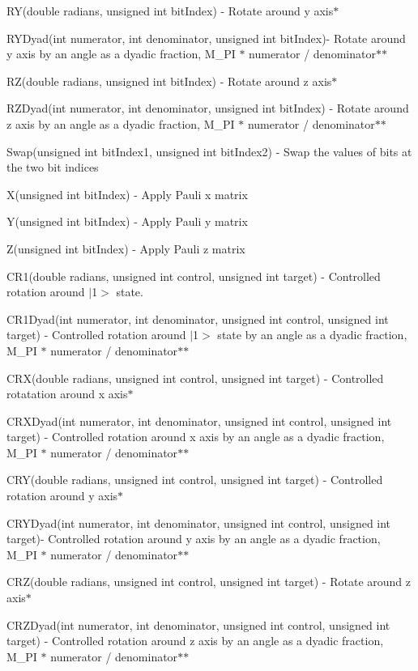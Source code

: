 R\+Y(double radians, unsigned int bit\+Index) -\/ Rotate around y axis$\ast$

R\+Y\+Dyad(int numerator, int denominator, unsigned int bit\+Index)-\/ Rotate around y axis by an angle as a dyadic fraction, M\+\_\+\+PI $\ast$ numerator / denominator$\ast$$\ast$

R\+Z(double radians, unsigned int bit\+Index) -\/ Rotate around z axis$\ast$

R\+Z\+Dyad(int numerator, int denominator, unsigned int bit\+Index) -\/ Rotate around z axis by an angle as a dyadic fraction, M\+\_\+\+PI $\ast$ numerator / denominator$\ast$$\ast$

Swap(unsigned int bit\+Index1, unsigned int bit\+Index2) -\/ Swap the values of bits at the two bit indices

X(unsigned int bit\+Index) -\/ Apply Pauli x matrix

Y(unsigned int bit\+Index) -\/ Apply Pauli y matrix

Z(unsigned int bit\+Index) -\/ Apply Pauli z matrix

C\+R1(double radians, unsigned int control, unsigned int target) -\/ Controlled rotation around $\vert$1$>$ state.

C\+R1\+Dyad(int numerator, int denominator, unsigned int control, unsigned int target) -\/ Controlled rotation around $\vert$1$>$ state by an angle as a dyadic fraction, M\+\_\+\+PI $\ast$ numerator / denominator$\ast$$\ast$

C\+R\+X(double radians, unsigned int control, unsigned int target) -\/ Controlled rotatation around x axis$\ast$

C\+R\+X\+Dyad(int numerator, int denominator, unsigned int control, unsigned int target) -\/ Controlled rotation around x axis by an angle as a dyadic fraction, M\+\_\+\+PI $\ast$ numerator / denominator$\ast$$\ast$

C\+R\+Y(double radians, unsigned int control, unsigned int target) -\/ Controlled rotation around y axis$\ast$

C\+R\+Y\+Dyad(int numerator, int denominator, unsigned int control, unsigned int target)-\/ Controlled rotation around y axis by an angle as a dyadic fraction, M\+\_\+\+PI $\ast$ numerator / denominator$\ast$$\ast$

C\+R\+Z(double radians, unsigned int control, unsigned int target) -\/ Rotate around z axis$\ast$

C\+R\+Z\+Dyad(int numerator, int denominator, unsigned int control, unsigned int target) -\/ Controlled rotation around z axis by an angle as a dyadic fraction, M\+\_\+\+PI $\ast$ numerator / denominator$\ast$$\ast$

